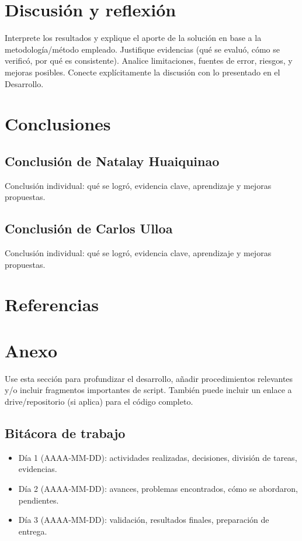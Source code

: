 \documentclass[10pt]{article}
\begin{document}
\section{Discusión y reflexión}
Interprete los resultados y explique el aporte de la solución en base a la metodología/método empleado. Justifique evidencias (qué se evaluó, cómo se verificó, por qué es consistente). Analice limitaciones, fuentes de error, riesgos, y mejoras posibles. Conecte explícitamente la discusión con lo presentado en el Desarrollo.

\section{Conclusiones}

\subsection*{Conclusión de Natalay Huaiquinao}
Conclusión individual: qué se logró, evidencia clave, aprendizaje y mejoras propuestas.

\subsection*{Conclusión de Carlos Ulloa}
Conclusión individual: qué se logró, evidencia clave, aprendizaje y mejoras propuestas.

\section{Referencias}



\appendix
\section{Anexo}
Use esta sección para profundizar el desarrollo, añadir procedimientos relevantes y/o incluir fragmentos importantes de script. También puede incluir un enlace a drive/repositorio (si aplica) para el código completo.

\subsection{Bitácora de trabajo}
\begin{itemize}
    \item Día 1 (AAAA-MM-DD): actividades realizadas, decisiones, división de tareas, evidencias.
    \item Día 2 (AAAA-MM-DD): avances, problemas encontrados, cómo se abordaron, pendientes.
    \item Día 3 (AAAA-MM-DD): validación, resultados finales, preparación de entrega.
\end{itemize}
\end{document}
